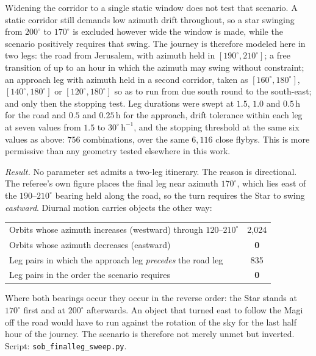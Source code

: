 \documentclass[11pt,a4paper]{article}
\begin{document}
Widening the corridor to a single static window does not test that scenario. A
static corridor still demands low azimuth drift throughout, so a star swinging
from $200^\circ$ to $170^\circ$ is excluded however wide the window is made,
while the scenario positively requires that swing. The journey is therefore
modeled here in two legs: the road from Jerusalem, with azimuth held in
$[190^\circ, 210^\circ]$; a free transition of up to an hour in which the
azimuth may swing without constraint; an approach leg with azimuth held in a
second corridor, taken as $[160^\circ,180^\circ]$, $[140^\circ,180^\circ]$ or
$[120^\circ,180^\circ]$ so as to run from due south round to the south-east;
and only then the stopping test. Leg durations were swept at $1.5$, $1.0$ and
$0.5$\,h for the road and $0.5$ and $0.25$\,h for the approach, drift tolerance
within each leg at seven values from $1.5$ to $30^\circ\,\mathrm{h}^{-1}$, and
the stopping threshold at the same six values as above: $756$ combinations,
over the same $6{,}116$ close flybys. This is more permissive than any geometry
tested elsewhere in this work.

\emph{Result.} No parameter set admits a two-leg itinerary. The reason is
directional. The referee's own figure places the final leg near azimuth
$170^\circ$, which lies east of the $190$--$210^\circ$ bearing held along the
road, so the turn requires the Star to swing \emph{eastward}. Diurnal motion
carries objects the other way:

\begin{center}
\begin{tabular}{@{}lc@{}}
\toprule
Orbits whose azimuth increases (westward) through $120$--$210^\circ$ & 2{,}024 \\
Orbits whose azimuth decreases (eastward) & \textbf{0} \\
\midrule
Leg pairs in which the approach leg \emph{precedes} the road leg & 835 \\
Leg pairs in the order the scenario requires & \textbf{0} \\
\bottomrule
\end{tabular}
\end{center}

Where both bearings occur they occur in the reverse order: the Star stands at
$170^\circ$ first and at $200^\circ$ afterwards. An object that turned east to
follow the Magi off the road would have to run against the rotation of the sky
for the last half hour of the journey. The scenario is therefore not merely
unmet but inverted. Script: \texttt{sob\_finalleg\_sweep.py}.
\end{document}
